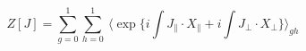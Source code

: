 \begin{equation}
  Z[J] = \sum^1_{g=0}\sum^1_{h=0}~\langle \exp \{ i\int J_{\parallel}
  \cdot X_{\parallel}
     + i\int J_\perp \cdot X_\perp \} \rangle_{gh}
\label{genfuno}
\end{equation}

